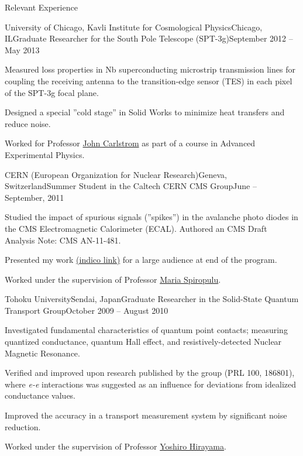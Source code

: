 \documentclass{resume}
\begin{document}
\begin{rsection}{Relevant Experience}
  \begin{rsubsection}{University of Chicago, Kavli Institute for Cosmological Physics}{Chicago, IL}{Graduate Researcher for the South Pole Telescope (SPT-3g)}{September 2012 -- May 2013}
  \item Measured loss properties in Nb superconducting microstrip transmission lines for coupling the receiving antenna to the transition-edge sensor (TES) in each pixel of the SPT-3g focal plane.
  \item Designed a special ''cold stage'' in Solid Works to minimize heat transfers and reduce noise. 
  \item Worked for Professor \href{https://kicp.uchicago.edu/people/profile/john_carlstrom.html}{John Carlstrom} as part of a course in Advanced Experimental Physics.
  \end{rsubsection}


  \begin{rsubsection}{CERN (European Organization for Nuclear Research)}{Geneva, Switzerland}{Summer Student in the Caltech CERN CMS Group}{June -- September, 2011}
  \item Studied the impact of spurious signals (''spikes'') in the avalanche photo diodes in the CMS Electromagnetic Calorimeter (ECAL). Authored an CMS Draft Analysis Note: CMS AN-11-481.
  \item Presented my work \href{http://indico.cern.ch/conferenceDisplay.py?confId=135576}{(indico link)} for a large audience at end of the program.
  \item Worked under the supervision of Professor \href{http://www.hep.caltech.edu/~smaria/}{Maria Spiropulu}.
  \end{rsubsection}


  \begin{rsubsection}{Tohoku University}{Sendai, Japan}{Graduate Researcher in the Solid-State Quantum Transport Group}{October 2009 -- August 2010}
  \item Investigated fundamental characteristics of quantum point contacts; measuring quantized conductance, quantum Hall effect, and resistively-detected Nuclear Magnetic Resonance.
  \item Verified and improved upon research published by the group (PRL 100, 186801), where \textit{e-e} interactions was suggested as an influence for deviations from idealized conductance values.
  \item Improved the accuracy in a transport measurement system by significant noise reduction.
  \item Worked under the supervision of Professor \href{http://quant-trans.org/lab/profile-e.html}{Yoshiro Hirayama}.
  \end{rsubsection}


\end{rsection}
\end{document}
